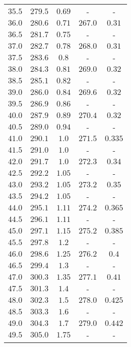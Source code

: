 \begin{table}
\begin{tabular}{c c c c c}
        $\num{35.5}$&$\num{279.5}$&$\num{0.69}$&-&-\\
        $\num{36.0}$&$\num{280.6}$&$\num{0.71}$&$\num{267.0}$&$\num{0.31}$\\
        $\num{36.5}$&$\num{281.7}$&$\num{0.75}$&-&-\\
        $\num{37.0}$&$\num{282.7}$&$\num{0.78}$&$\num{268.0}$&$\num{0.31}$\\
        $\num{37.5}$&$\num{283.6}$&$\num{0.8}$&-&-\\
        $\num{38.0}$&$\num{284.3}$&$\num{0.81}$&$\num{269.0}$&$\num{0.32}$\\
        $\num{38.5}$&$\num{285.1}$&$\num{0.82}$&-&-\\
        $\num{39.0}$&$\num{286.0}$&$\num{0.84}$&$\num{269.6}$&$\num{0.32}$\\
        $\num{39.5}$&$\num{286.9}$&$\num{0.86}$&-&-\\
        $\num{40.0}$&$\num{287.9}$&$\num{0.89}$&$\num{270.4}$&$\num{0.32}$\\
        $\num{40.5}$&$\num{289.0}$&$\num{0.94}$&-&-\\
        $\num{41.0}$&$\num{290.1}$&$\num{1.0}$&$\num{271.5}$&$\num{0.335}$\\
        $\num{41.5}$&$\num{291.0}$&$\num{1.0}$&-&-\\
        $\num{42.0}$&$\num{291.7}$&$\num{1.0}$&$\num{272.3}$&$\num{0.34}$\\
        $\num{42.5}$&$\num{292.2}$&$\num{1.05}$&-&-\\
        $\num{43.0}$&$\num{293.2}$&$\num{1.05}$&$\num{273.2}$&$\num{0.35}$\\
        $\num{43.5}$&$\num{294.2}$&$\num{1.05}$&-&-\\
        $\num{44.0}$&$\num{295.1}$&$\num{1.11}$&$\num{274.2}$&$\num{0.365}$\\
        $\num{44.5}$&$\num{296.1}$&$\num{1.11}$&-&-\\
        $\num{45.0}$&$\num{297.1}$&$\num{1.15}$&$\num{275.2}$&$\num{0.385}$\\
        $\num{45.5}$&$\num{297.8}$&$\num{1.2}$&-&-\\
        $\num{46.0}$&$\num{298.6}$&$\num{1.25}$&$\num{276.2}$&$\num{0.4}$\\
        $\num{46.5}$&$\num{299.4}$&$\num{1.3}$&-&-\\
        $\num{47.0}$&$\num{300.3}$&$\num{1.35}$&$\num{277.1}$&$\num{0.41}$\\
        $\num{47.5}$&$\num{301.3}$&$\num{1.4}$&-&-\\
        $\num{48.0}$&$\num{302.3}$&$\num{1.5}$&$\num{278.0}$&$\num{0.425}$\\
        $\num{48.5}$&$\num{303.3}$&$\num{1.6}$&-&-\\
        $\num{49.0}$&$\num{304.3}$&$\num{1.7}$&$\num{279.0}$&$\num{0.442}$\\
        $\num{49.5}$&$\num{305.0}$&$\num{1.75}$&-&-\\
        \bottomrule
    \end{tabular}
\end{table}
